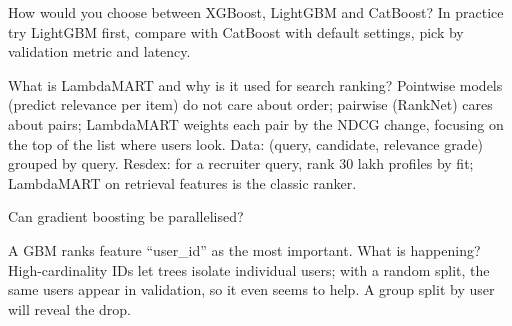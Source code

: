\begin{qa}{How would you choose between XGBoost, LightGBM and CatBoost?}
\why In practice try LightGBM first, compare with CatBoost with default settings, pick by validation metric and latency.
\end{qa}

\begin{qa}{What is LambdaMART and why is it used for search ranking?}
\why Pointwise models (predict relevance per item) do not care about order; pairwise (RankNet) cares about pairs; LambdaMART weights each
pair by the NDCG change, focusing on the top of the list where users look. Data: (query, candidate, relevance grade) grouped by query.
\inpractice Resdex: for a recruiter query, rank 30 lakh profiles by fit; LambdaMART on retrieval features is the classic ranker.
\end{qa}

\begin{qa}{Can gradient boosting be parallelised?}
\end{qa}

\begin{qa}{\deep A GBM ranks feature ``user\_id'' as the most important. What is happening?}
\why High-cardinality IDs let trees isolate individual users; with a random split, the same users appear in validation, so it even
seems to help. A group split by user will reveal the drop.
\end{qa}
